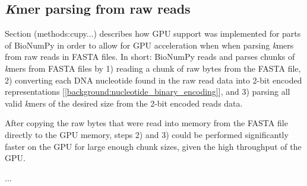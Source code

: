 \subsection{\textit{K}mer parsing from raw reads}
Section (methods:cupy...) describes how GPU support was implemented for parts of BioNumPy \cite{bionumpy} in order to allow for GPU acceleration when when parsing \textit{k}mers from raw reads in FASTA files.
In short: BioNumPy reads and parses chunks of \textit{k}mers from FASTA files by 
1) reading a chunk of raw bytes from the FASTA file, 
2) converting each DNA nucleotide found in the raw read data into 2-bit encoded representations [\ref{background:nucleotide_binary_encoding}], 
and 3) parsing all valid \textit{k}mers of the desired size from the 2-bit encoded reads data.

After copying the raw bytes that were read into memory from the FASTA file directly to the GPU memory, steps 2) and 3) could be performed significantly faster on the GPU for large enough chunk sizes, given the high throughput of the GPU.

...
